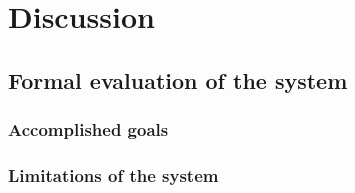 \chapter{Discussion}
\label{chap:discussion}

\section{Formal evaluation of the system}

\subsection{Accomplished goals}

\subsection{Limitations of the system}